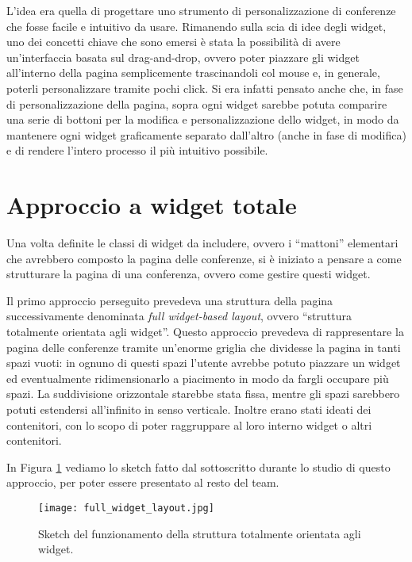         L'idea era quella di progettare uno strumento di personalizzazione di conferenze che fosse facile e intuitivo da usare. Rimanendo sulla scia di idee degli widget, uno dei concetti chiave che sono emersi è stata la possibilità di avere un'interfaccia basata sul drag-and-drop, ovvero poter piazzare gli widget all'interno della pagina semplicemente trascinandoli col mouse e, in generale, poterli personalizzare tramite pochi click. Si era infatti pensato anche che, in fase di personalizzazione della pagina, sopra ogni widget sarebbe potuta comparire una serie di bottoni per la modifica e personalizzazione dello widget, in modo da mantenere ogni widget graficamente separato dall'altro (anche in fase di modifica) e di rendere l'intero processo il più intuitivo possibile.
       	
    \section{Approccio a widget totale} \label{sec:ccp;approccio_widget_totale}
    
        Una volta definite le classi di widget da includere, ovvero i ``mattoni'' elementari che avrebbero composto la pagina delle conferenze, si è iniziato a pensare a come strutturare la pagina di una conferenza, ovvero come gestire questi widget.
        
        Il primo approccio perseguito prevedeva una struttura della pagina successivamente denominata \textit{full widget-based layout}, ovvero ``struttura totalmente orientata agli widget''. Questo approccio prevedeva di rappresentare la pagina delle conferenze tramite un'enorme griglia che dividesse la pagina in tanti spazi vuoti: in ognuno di questi spazi l'utente avrebbe potuto piazzare un widget ed eventualmente ridimensionarlo a piacimento in modo da fargli occupare più spazi. La suddivisione orizzontale starebbe stata fissa, mentre gli spazi sarebbero potuti estendersi all'infinito in senso verticale. Inoltre erano stati ideati dei contenitori, con lo scopo di poter raggruppare al loro interno widget o altri contenitori.
        
        In Figura \ref{fig:full_widget_layout} vediamo lo sketch fatto dal sottoscritto durante lo studio di questo approccio, per poter essere presentato al resto del team.
        
       	\begin{figure}[h!]
       		\begin{center}
       			\texttt{[image: full\_widget\_layout.jpg]}
       		\end{center}
       		\caption[Sketch della struttura a widget totale]{Sketch del funzionamento della struttura totalmente orientata agli widget.}
       		\label{fig:full_widget_layout}
       	\end{figure}
       	
